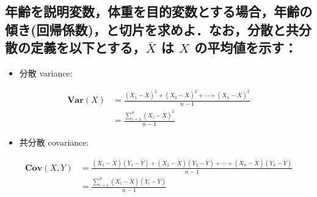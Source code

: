 \documentclass[11pt,]{problemset}
\newenvironment{Shaded}{\begin{snugshade}}{\end{snugshade}}
\newcommand{\KeywordTok}[1]{\textcolor[rgb]{0.13,0.29,0.53}{\textbf{#1}}}
\newcommand{\CommentTok}[1]{\textcolor[rgb]{0.56,0.35,0.01}{\textit{#1}}}
\newcommand{\OperatorTok}[1]{\textcolor[rgb]{0.81,0.36,0.00}{\textbf{#1}}}
\newcommand{\NormalTok}[1]{#1}
\providecommand{\tightlist}{%
  \setlength{\itemsep}{0pt}\setlength{\parskip}{0pt}}
\begin{document}
\begin{Shaded}
\end{Shaded}

\newpage

\vfill

\subsection{\texorpdfstring{年齢を説明変数，体重を目的変数とする場合，年齢の傾き(回帰係数)，と切片を求めよ．なお，分散と共分散の定義を以下とする，\(\bar{X}\)
は \(X\)
の平均値を示す：}{年齢を説明変数，体重を目的変数とする場合，年齢の傾き(回帰係数)，と切片を求めよ．なお，分散と共分散の定義を以下とする，\textbackslash{}bar\{X\} は X の平均値を示す：}}\label{barx--x-}

\begin{itemize}
\tightlist
\item
  分散 variance:
\end{itemize}

\[
\begin{aligned}
\mathbf{Var}(X) & = \frac{(X_1-\bar{X})^2+(X_2-\bar{X})^2+\cdots+(X_n-\bar{X})^2}{n - 1} \\
                & = \frac{\sum_{i=1}^n(X_i-\bar{X})^2}{n -1}
\end{aligned}
\]

\begin{itemize}
\tightlist
\item
  共分散 covariance:
\end{itemize}

\[
\begin{aligned}
\mathbf{Cov}(X, Y) & = \frac{(X_1 - \bar{X})(Y_1-\bar{Y}) + (X_2 - \bar{X})(Y_2-\bar{Y}) + \cdots + (X_n - \bar{X})(Y_n-\bar{Y})}{n - 1} \\
                   & = \frac{\sum_{i = 1}^n(X_i - \bar{X})(Y_i-\bar{Y})}{n - 1}
\end{aligned}
\]
\end{document}
